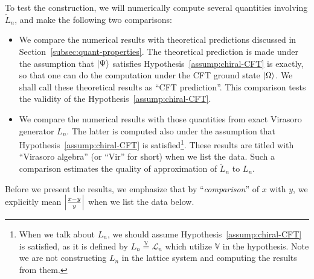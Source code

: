 \documentclass[12pt, nofootinbib]{article}
\theoremstyle{plain}
\theoremstyle{assumption}
\theoremstyle{definition}
\theoremstyle{plain}
\theoremstyle{plain}
\theoremstyle{plain}
\theoremstyle{plain}
\theoremstyle{plain}
\def\veq{\stackrel{\mathbb{V}}{=}}
\def\Leff{\widetilde{L}}
\def\Lcft{\mathscr{L}}
\begin{document}
To test the construction, we will numerically compute several quantities involving $\Leff_n$, and make the following two comparisons: 
\begin{itemize}
    \item We compare the numerical results with theoretical predictions discussed in Section~\ref{subsec:quant-properties}. The theoretical prediction is made under the assumption that $\left|\Psi\right\rangle$ satisfies Hypothesis~\ref{assump:chiral-CFT} is exactly, so that one can do the computation under the CFT ground state $\left|\Omega\right\rangle$. We shall call these theoretical results as ``CFT prediction''. This comparison tests the validity of the Hypothesis~\ref{assump:chiral-CFT}. 
    \item We compare the numerical results with those quantities from exact Virasoro generator $L_n$. The latter is computed also under the assumption that Hypothesis~\ref{assump:chiral-CFT} is satisfied\footnote{When we talk about $L_n$, we should assume Hypothesis~\ref{assump:chiral-CFT} is satisfied, as it is defined by $L_n \veq \Lcft_n$ which utilize $\mathbb{V}$ in the hypothesis. Note we are not constructing $L_n$ in the lattice system and computing the results from them.}. These results are titled with ``Virasoro algebra'' (or ``Vir'' for short) when we list the data. Such a comparison estimates the quality of approximation of $\Leff_n$ to $L_n$. 
\end{itemize}
Before we present the results, we emphasize that by ``\emph{comparison}'' of $x$ with $y$, we explicitly mean $\left|{x - y \over y }\right|$ when we list the data below.    
\end{document}
